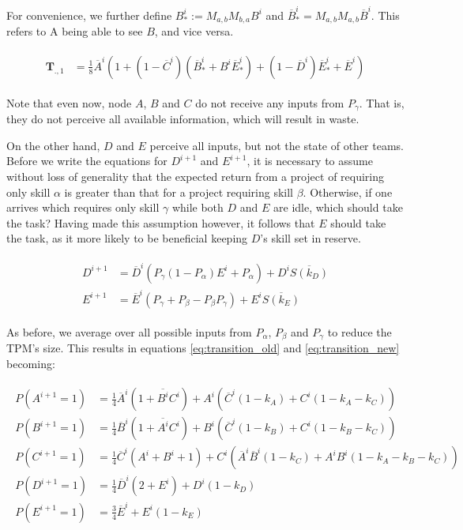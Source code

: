 For convenience, we further define $B^i_*:= M_{a,b}M_{b,a}B^i$ and $\overline{B}^i_* = M_{a,b}M_{a,b}\overline{B}^i$. This refers to A being able to see $B$, and vice versa. 

\begin{align}
\begin{split}
\label{eq:general_transition_averaged}
\mathbf{T}_{.,1} &= \frac{1}{8}\overline{A}^{i} \left(1 + (1-\overline{C}^i )(\overline{B}^i_*+B^i\overline{E}^i_*)+ (1-\overline{D}^i)\overline{E}^i_* + \overline{E}^i\right)
\end{split}
\end{align}


Note that even now, node $A$, $B$ and $C$ do not receive any inputs from $P_\gamma$. That is, they do not perceive all available information, which will result in waste. 

On the other hand, $D$ and $E$ perceive all inputs, but not the state of other teams. Before we write the equations for $D^{i+1}$ and $E^{i+1}$, it is necessary to assume without loss of generality that the expected return from a project of requiring only skill $\alpha$ is greater than that for a project requiring skill $\beta$. Otherwise, if one arrives which requires only skill $\gamma$ while both $D$ and $E$ are idle, which should take the task? Having made this assumption however, it follows that $E$ should take the task, as it more likely to be beneficial keeping $D$'s skill set in reserve.

\begin{align}
\begin{split}
\label{eq:transition_new}
D^{i+1} &= \overline{D}^i \left( P_\gamma (1-P_\alpha)E^i + P_\alpha \right) + D^i\overline{S(k_D)}\\
E^{i+1} &= \overline{E}^i \left( P_\gamma + P_\beta-P_\beta P_\gamma \right) + E^i\overline{S(k_E)}
\end{split}
\end{align}

As before, we average over all possible inputs from $P_\alpha$, $P_\beta$ and $P_\gamma$ to reduce the TPM's size. This results in equations \ref{eq:transition_old} and \ref{eq:transition_new} becoming:

\begin{align}
\begin{split}
\label{eq:transition_averaged}
P(A^{i+1}=1) &= \frac{1}{4}\overline{A}^{i} \left(1 + \overline{B^i} C^i\right)+ A^i \left(\overline{C}^i(1-k_A) + C^i (1-k_A-k_C)\right)\\
P(B^{i+1}=1) &= \frac{1}{4}\overline{B}^{i} \left(1 + \overline{A^i} C^i\right)+ B^i \left(\overline{C}^i(1-k_B) + C^i (1-k_B-k_C)\right)\\
P(C^{i+1}=1)&= \frac{1}{4}\overline{C}^i\left(A^i  + B^i + 1 \right) + C^i \left(\overline{A}^i\overline{B}^i(1-k_C) +A^i B^i (1-k_A-k_B-k_C)\right)\\
P(D^{i+1}=1) &= \frac{1}{4}\overline{D}^i \left(2 +E^i \right) + D^i(1-k_D)\\
P(E^{i+1}=1) &= \frac{3}{4}\overline{E}^i  + E^i(1-k_E)\\
\end{split}
\end{align}

